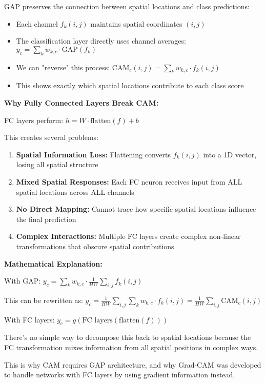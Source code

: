 \documentclass[12pt]{article}
\begin{document}
\begin{enumerate}[(a)]
{    GAP preserves the connection between spatial locations and class predictions:
    
    \begin{itemize}
        \item Each channel $f_k(i,j)$ maintains spatial coordinates $(i,j)$
        \item The classification layer directly uses channel averages: $y_c = \sum_k w_{k,c} \cdot \text{GAP}(f_k)$
        \item We can "reverse" this process: $\text{CAM}_c(i,j) = \sum_k w_{k,c} \cdot f_k(i,j)$
        \item This shows exactly which spatial locations contribute to each class score
    \end{itemize}
    
    \textbf{Why Fully Connected Layers Break CAM:}
    
    FC layers perform: $h = W \cdot \text{flatten}(f) + b$
    
    This creates several problems:
    \begin{enumerate}
        \item \textbf{Spatial Information Loss:} Flattening converts $f_k(i,j)$ into a 1D vector, losing all spatial structure
        \item \textbf{Mixed Spatial Responses:} Each FC neuron receives input from ALL spatial locations across ALL channels
        \item \textbf{No Direct Mapping:} Cannot trace how specific spatial locations influence the final prediction
        \item \textbf{Complex Interactions:} Multiple FC layers create complex non-linear transformations that obscure spatial contributions
    \end{enumerate}
    
    \textbf{Mathematical Explanation:}
    
    With GAP: $y_c = \sum_k w_{k,c} \cdot \frac{1}{HW}\sum_{i,j} f_k(i,j)$ 
    
    This can be rewritten as: $y_c = \frac{1}{HW} \sum_{i,j} \sum_k w_{k,c} \cdot f_k(i,j) = \frac{1}{HW} \sum_{i,j} \text{CAM}_c(i,j)$
    
    With FC layers: $y_c = g(\text{FC layers}(\text{flatten}(f)))$
    
    There's no simple way to decompose this back to spatial locations because the FC transformation mixes information from all spatial positions in complex ways.
    
    This is why CAM requires GAP architecture, and why Grad-CAM was developed to handle networks with FC layers by using gradient information instead.
    }
\end{enumerate}
\end{document}
